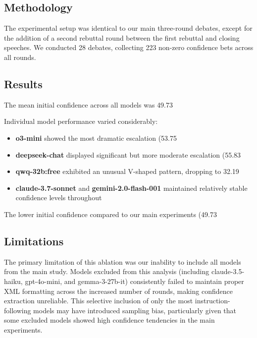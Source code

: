 \documentclass{article}
\begin{document}
\subsection{Methodology}
The experimental setup was identical to our main three-round debates, except for the addition of a second rebuttal round between the first rebuttal and closing speeches. We conducted 28 debates, collecting 223 non-zero confidence bets across all rounds.

\subsection{Results}
The mean initial confidence across all models was 49.73%

Individual model performance varied considerably:

\begin{itemize}
    \item \textbf{o3-mini} showed the most dramatic escalation (53.75%
    \item \textbf{deepseek-chat} displayed significant but more moderate escalation (55.83%
    \item \textbf{qwq-32b:free} exhibited an unusual V-shaped pattern, dropping to 32.19%
    \item \textbf{claude-3.7-sonnet} and \textbf{gemini-2.0-flash-001} maintained relatively stable confidence levels throughout
\end{itemize}

The lower initial confidence compared to our main experiments (49.73%

\subsection{Limitations}
The primary limitation of this ablation was our inability to include all models from the main study. Models excluded from this analysis (including claude-3.5-haiku, gpt-4o-mini, and gemma-3-27b-it) consistently failed to maintain proper XML formatting across the increased number of rounds, making confidence extraction unreliable. This selective inclusion of only the most instruction-following models may have introduced sampling bias, particularly given that some excluded models showed high confidence tendencies in the main experiments.
\end{document}
